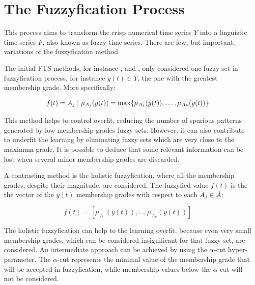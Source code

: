 %
\section{The Fuzzyfication Process}
\label{sec:fts_fuzzyfication}

This process aims to transform the crisp numerical time series $Y$ into a linguistic time series $F$, also known as fuzzy time series. There are few, but important, variations of the fuzzyfication method.

The initial FTS methods, for instance \cite{song1993fuzzy}, \cite{chen1996forecasting} and \cite{yu2005weighted}, only considered one fuzzy set in fuzzyfication process, for instance $y(t) \in Y$, the one with the greatest membership grade. More specifically:

\begin{equation}
f(t) = A_j\; |\; \mu_{A_j}(y(t)) = \max\{ \mu_{A_1}(y(t)), \ldots, \mu_{A_k}(y(t)) \}    
\label{eqn:fuzzyfication_maximum}
\end{equation}

This method helps to control overfit, reducing the number of spurious patterns generated by low membership grades fuzzy sets. However, it can also contribute to underfit the learning by eliminating fuzzy sets which are very close to the maximum grade. It is possible to deduce that some relevant information can be lost when several minor membership grades are discarded.

A contrasting method is the holistic fuzzyfication, where all the membership grades, despite their magnitude, are considered. The fuzzyfied value $f(t)$ is the the vector of the $y(t)$ membership grades with respect to each $A_j \in \tilde{A}$:

\begin{equation}
f(t) = [\mu_{A_1}(y(t)), \ldots, \mu_{A_k}(y(t)) ]    
\label{eqn:fuzzyfication_holistic}
\end{equation}

The holistic fuzzyfication can help to the learning overfit, because even very small membership grades, which can be considered insignificant for that fuzzy set, are considered. An intermediate approach can be achieved by using the $\alpha$-cut hyper-parameter. The $\alpha$-cut represents the minimal value of the membership grade that will be accepted in fuzzyfication, while membership values below the $\alpha$-cut will not be considered. 

